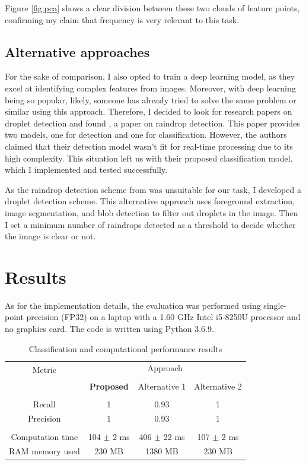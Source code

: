 \documentclass[conference]{IEEEtran}
\begin{document}
Figure \ref{fig:pca} shows a clear division between these two clouds of feature points, confirming my claim that frequency is very relevant to this task.

\subsection{Alternative approaches}

For the sake of comparison, I also opted to train a deep learning model, as they excel at identifying complex features from images. Moreover, with deep learning being so popular, likely, someone has already tried to solve the same problem or similar using this approach. Therefore, I decided to look for research papers on droplet detection and found \cite{Bae2019}, a paper on raindrop detection. This paper provides two models, one for detection and one for classification. However, the authors claimed that their detection model wasn't fit for real-time processing due to its high complexity. This situation left us with their proposed classification model, which I implemented and tested successfully.

As the raindrop detection scheme from \cite{Bae2019} was unsuitable for our task, I developed a droplet detection scheme. This alternative approach uses foreground extraction, image segmentation, and blob detection to filter out droplets in the image. Then I set a minimum number of raindrops detected as a threshold to decide whether the image is clear or not.

\section{Results}

As for the implementation details, the evaluation was performed using single-point precision (FP32) on a laptop with a 1.60 GHz Intel i5-8250U processor and no graphics card. The code is written using Python 3.6.9.

\begin{table}[h!]
\caption{Classification and computational performance results}
\begin{tabularx}{\textwidth}{|c|c|c|c|}
\cline{1-4}
\\[-1em]
\multirow{2}{*}{Metric} & \multicolumn{3}{c|}{Approach}\\
\cline{2-4}
\\[-1em]
& \textbf{Proposed} & Alternative 1 & Alternative 2\\
\cline{1-4}
\\[-1em]
Recall & 1 & 0.93 & 1\\
Precision & 1 & 0.93 & 1\\
\cline{1-4}
\\[-1em]
Computation time & 104 $\pm$ 2 ms & 406 $\pm$ 22 ms & 107 $\pm$ 2 ms\\
RAM memory used & 230 MB & 1380 MB & 230 MB\\
\cline{1-4}
\end{tabularx}
\end{table}
\end{document}
